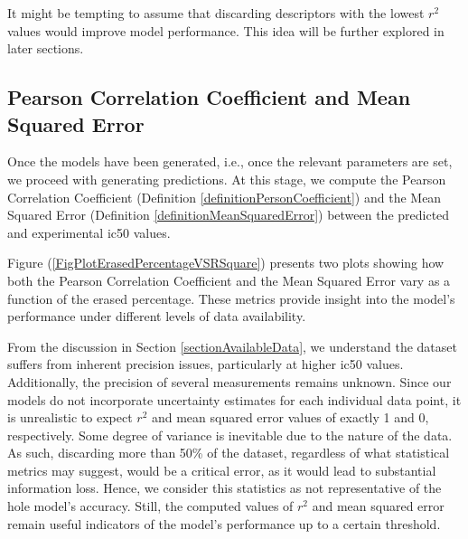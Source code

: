 \documentclass[11pt]{article}
\begin{document}
It might be tempting to assume that discarding descriptors with the lowest $r^2$ values would improve model performance. This idea will be further explored in later sections.

\subsection{Pearson Correlation Coefficient and Mean Squared Error}\label{sectionPersonCorrelationFactor}

Once the models have been generated, i.e., once the relevant parameters are set, we proceed with generating predictions. At this stage, we compute the Pearson Correlation Coefficient (Definition \ref{definitionPersonCoefficient}) and the Mean Squared Error (Definition \ref{definitionMeanSquaredError}) between the predicted and experimental \gls{ic50} values.

Figure (\ref{FigPlotErasedPercentageVSRSquare}) presents two plots showing how both the Pearson Correlation Coefficient and the Mean Squared Error vary as a function of the erased percentage. These metrics provide insight into the model’s performance under different levels of data availability.

From the discussion in Section \ref{sectionAvailableData}, we understand the dataset suffers from inherent precision issues, particularly at higher \gls{ic50} values. Additionally, the precision of several measurements remains unknown. Since our models do not incorporate uncertainty estimates for each individual data point, it is unrealistic to expect $r^2$ and mean squared error values of exactly 1 and 0, respectively. Some degree of variance is inevitable due to the nature of the data. As such, discarding more than 50\% of the dataset, regardless of what statistical metrics may suggest, would be a critical error, as it would lead to substantial information loss. Hence, we consider this statistics as not representative of the hole model's accuracy. Still, the computed values of $r^2$ and mean squared error remain useful indicators of the model's performance up to a certain threshold.
\end{document}
